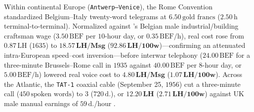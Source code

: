 \documentclass[11pt,a4paper]{article}
\newcommand{\gbp}{\symbol{"00A3}}
\newcommand{\lhBEeighteenMsg}{18.57}
\newcommand{\lhBEeighteenHundred}{92.86}
\newcommand{\lhBEnineteenMsg}{4.80}
\newcommand{\lhBEnineteenHundred}{1.07}
\begin{document}
Within continental Europe (\texttt{Antwerp--Venice}), the \citet{ITU1872} Rome Convention standardized Belgium--Italy twenty-word telegrams at $6.50\,\text{gold francs}$ ($2.50\,\text{h}$ terminal-to-terminal). Normalized against \citet{Scholliers1995}'s Belgian male industrial/building craftsman wage ($3.50\,\text{BEF}$ per $10$-hour day, or $0.35\,\text{BEF/h}$), real cost rose from $0.87\,\text{LH}$ ($1635$) to $\mathbf{\lhBEeighteenMsg\,\text{LH/Msg}}$ ($\mathbf{\lhBEeighteenHundred\,\text{LH/100w}}$)---confirming an attenuated intra-European speed--cost inversion---before interwar telephony ($24.00\,\text{BEF}$ for a three-minute Brussels--Rome call in $1935$ against $40.00\,\text{BEF}$ per $8$-hour day, or $5.00\,\text{BEF/h}$) lowered real voice cost to $\mathbf{\lhBEnineteenMsg\,\text{LH/Msg}}$ ($\mathbf{\lhBEnineteenHundred\,\text{LH/100w}}$). Across the Atlantic, the \texttt{TAT-1} coaxial cable (September 25, $1956$) cut a three-minute call ($450\,\text{spoken words}$) to \gbp 3 ($720\,\text{d.}$), or $\mathbf{12.20\,\text{LH}}$ ($\mathbf{2.71\,\text{LH/100w}}$) against UK male manual earnings of $59\,\text{d.}$/hour \citep{MinLabour1956}.
\end{document}
